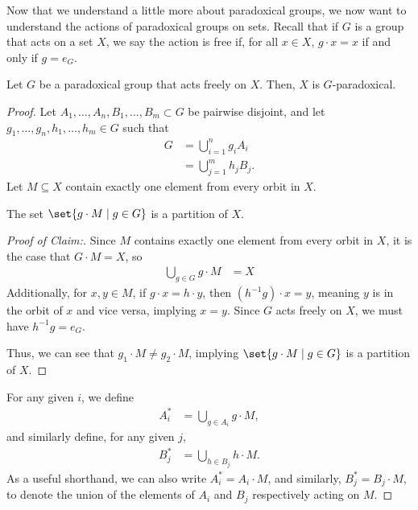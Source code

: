 \documentclass[10pt]{mypackage2}
\begin{document}
Now that we understand a little more about paradoxical groups, we now want to understand the actions of paradoxical groups on sets. Recall that if $G$ is a group that acts on a set $X$, we say the action is free if, for all $x\in X$, $g\cdot x = x$ if and only if $g = e_G$.
\begin{proposition}\label{prop:paradoxical_group_free_action}
  Let $G$ be a paradoxical group that acts freely on $X$. Then, $X$ is $G$-paradoxical.
\end{proposition}
\begin{proof}
  Let $A_1,\dots,A_n,B_1,\dots,B_m\subset G$ be pairwise disjoint, and let $g_1,\dots,g_n,h_1,\dots,h_m\in G$ such that
  \begin{align*}
    G &= \bigcup_{i=1}^{n}g_iA_i\\
      &= \bigcup_{j=1}^{m}h_jB_j.
  \end{align*}
  Let $M\subseteq X$ contain exactly one element from every orbit in $X$.
  \begin{claim}
  The set $\set{g\cdot M\mid g\in G}$ is a partition of $X$.
  \end{claim}
  \begin{proof}[Proof of Claim:]
  Since $M$ contains exactly one element from every orbit in $X$, it is the case that $G\cdot M = X$, so
  \begin{align*}
    \bigcup_{g\in G} g\cdot M &= X
  \end{align*}
  Additionally, for $x,y\in M$, if $g\cdot x = h\cdot y$, then $\left(h^{-1}g\right)\cdot x = y$, meaning $y$ is in the orbit of $x$ and vice versa, implying $x = y$. Since $G$ acts freely on $X$, we must have $h^{-1}g = e_G$.\newline

  Thus, we can see that $g_1\cdot M \neq g_2\cdot M$, implying $\set{g\cdot M\mid g\in G}$ is a partition of $X$.
  \end{proof}

  For any given $i$, we define
  \begin{align*}
    A_i^{\ast} &= \bigcup_{g\in A_i}g\cdot M,
  \end{align*}
  and similarly define, for any given $j$,
  \begin{align*}
    B_j^{\ast} &= \bigcup_{h\in B_j}h\cdot M.
  \end{align*}
  As a useful shorthand, we can also write $A_i^{\ast} = A_i\cdot M$, and similarly, $B_j^{\ast} = B_j\cdot M$, to denote the union of the elements of $A_i$ and $B_j$ respectively acting on $M$.\newline


\end{proof}
\end{document}
